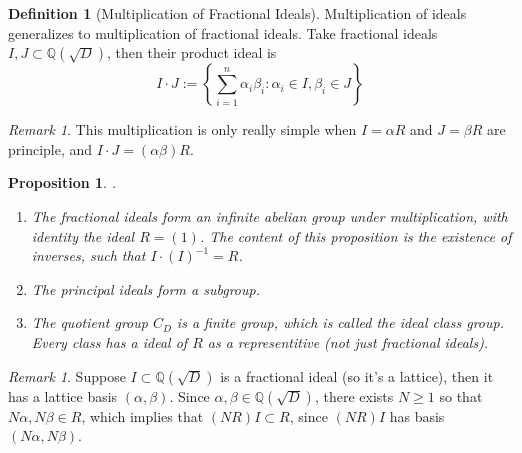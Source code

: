 \documentclass[12pt]{article}
\newtheorem{prop}[thm]{Proposition}
\theoremstyle{definition}
\newtheorem{defn}[thm]{Definition}
\theoremstyle{remark}
\newtheorem{rmk}[thm]{Remark}
\numberwithin{equation}{section}
\newcommand\Q{\mathbb Q}    %
\begin{document}
\vspace{15pt}

\begin{defn}[Multiplication of Fractional Ideals]
        Multiplication of ideals generalizes to multiplication of fractional ideals. Take fractional ideals $I,J \subset \Q(\sqrt{D})$, then their product ideal is \begin{equation}
                I\cdot J := \left\{\sum\limits_{i=1}^n\alpha_i\beta_i:\alpha_i \in I,\beta_i \in J \right\}
        \end{equation}
\end{defn}


\vspace{15pt}


\begin{rmk}
        This multiplication is only really simple when $I = \alpha R$ and $J = \beta R$ are principle, and $I\cdot J = (\alpha\beta) R$.
\end{rmk}


\vspace{15pt}


\begin{prop}
        .\newline \begin{enumerate}
                \item The fractional ideals form an infinite abelian group under multiplication, with identity the ideal $R = (1)$. The content of this proposition is the existence of inverses, such that $I\cdot (I)^{-1} = R$.
                \item The principal ideals form a subgroup.
                \item The quotient group $C_D$ is a finite group, which is called the ideal class group. Every class has a ideal of $R$ as a representitive (not just fractional ideals).
        \end{enumerate}
\end{prop}


\vspace{15pt}

\begin{rmk}
        Suppose $I \subset \Q(\sqrt{D})$ is a fractional ideal (so it's a lattice), then it has a lattice basis $(\alpha,\beta)$. Since $\alpha,\beta \in \Q(\sqrt{D})$, there exists $N \geq 1$ so that $N\alpha,N\beta \in R$, which implies that $(NR)I \subset R$, since $(NR)I$ has basis $(N\alpha,N\beta)$.
\end{rmk}
\end{document}
